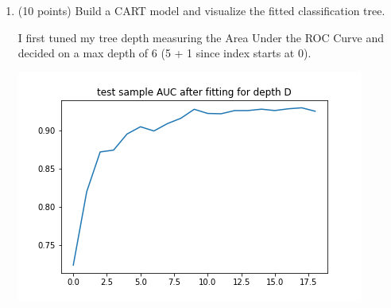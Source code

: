 \documentclass[twoside,10pt]{article}
\begin{document}
\begin{enumerate}
\begin{enumerate}

\item (10 points) Build a CART model and visualize the fitted classification tree.

I first tuned my tree depth measuring the Area Under the ROC Curve and decided on a max depth of 6 (5 + 1 since index starts at 0).

\includegraphics[scale=0.5]{tune_dectree_depth}


\end{enumerate}
\end{enumerate}
\end{document}
